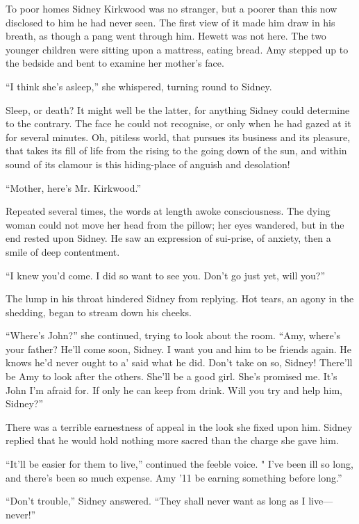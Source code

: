 To poor homes Sidney Kirkwood was no stranger, but a poorer than this
now disclosed to him he had never seen. The first view of it made him
draw in his breath, as though a pang went through him. Hewett was not
here. The two younger children were sitting upon a mattress, eating
bread. Amy stepped up to the bedside and bent to examine her mother's
face.

``I think she's asleep,'' she whispered, turning round to Sidney.

Sleep, or death? It might well be the latter, for anything Sidney could
determine to the contrary. The face he could not recognise, or only when
he had gazed at it for several minutes. Oh, pitiless world, that pursues
its business and its pleasure, that takes its fill of life from the
rising to the going down of the sun, and within sound of its clamour is
this hiding-place of anguish and desolation!

{\protect\hypertarget{168}{}{}}``Mother, here's Mr. Kirkwood.''

Repeated several times, the words at length awoke consciousness. The
dying woman could not move her head from the pillow; her eyes wandered,
but in the end rested upon Sidney. He saw an expression of sui-prise, of
anxiety, then a smile of deep contentment.

``I knew you'd come. I did so want to see you. Don't go just yet, will
you?''

The lump in his throat hindered Sidney from replying. Hot tears, an
agony in the shedding, began to stream down his cheeks.

``Where's John?'' she continued, trying to look about the room. ``Amy,
where's your father? He'll come soon, Sidney. I want you and him to be
friends again. He knows he'd never ought to a' said what he did. Don't
take on so, Sidney! There'll be Amy to look after the others. She'll be
a good girl. She's promised me. It's John I'm afraid for. If only he can
keep from drink. Will you try and help him, Sidney?''

There was a terrible earnestness of appeal
{\protect\hypertarget{169}{}{}}in the look she fixed upon him. Sidney
replied that he would hold nothing more sacred than the charge she gave
him.

``It'll be easier for them to live,'' continued the feeble voice. " I've
been ill so long, and there's been so much expense. Amy '11 be earning
something before long.''

``Don't trouble,'' Sidney answered. ``They shall never want as long as I
live---never!''

